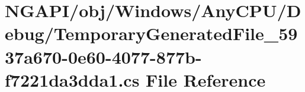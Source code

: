 \hypertarget{_n_g_a_p_i_2obj_2_windows_2_any_c_p_u_2_debug_2_temporary_generated_file__5937a670-0e60-4077-877b-f7221da3dda1_8cs}{}\section{N\+G\+A\+P\+I/obj/\+Windows/\+Any\+C\+P\+U/\+Debug/\+Temporary\+Generated\+File\+\_\+5937a670-\/0e60-\/4077-\/877b-\/f7221da3dda1.cs File Reference}
\label{_n_g_a_p_i_2obj_2_windows_2_any_c_p_u_2_debug_2_temporary_generated_file__5937a670-0e60-4077-877b-f7221da3dda1_8cs}
